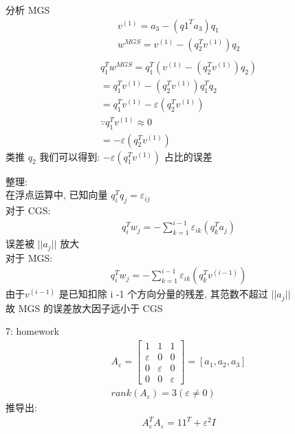 \documentclass[12pt]{article}
\begin{document}
\begin{flushleft}
    分析 MGS \\
    \begin{align}
        v^{(1)} =  a_{3} - (q1^{T}a_{3})q_{1}        \\
        w^{MGS} =  v^{(1)} - (q_{2}^{T}v^{(1)})q_{2} \\
    \end{align}
    \begin{align}
        q_{1}^{T}w^{MGS} = q_{1}^{T}(v^{(1)} -  (q_{2}^{T}v^{(1)})q_{2}) \\
        = q_{1}^{T}v^{(1)} -  (q_{2}^{T}v^{(1)})q_{1}^{T}q_{2}           \\
        = q_{1}^{T}v^{(1)}   -\varepsilon(q_{2}^{T}v^{(1)})              \\
        \because q_{1}^{T}v^{(1)}  \approx 0                             \\
        =  -\varepsilon(q_{2}^{T}v^{(1)})
    \end{align}
    类推 $q_{2}$ 我们可以得到: $-\varepsilon(q_{1}^{T}v^{(1)})$ 占比的误差

    整理: \\
    在浮点运算中, 已知向量 $q_{i}^{T}q_{j} = \varepsilon_{ij}$ \\
    对于 CGS: \\
    \begin{align}
        q_{i}^{T}w_{j} =  - \sum_{k = 1}^{i -1} \varepsilon_{ik}(q_{k}^{T}a_{j})
    \end{align}
    误差被 $||a_{j}||$ 放大 \\
    对于 MGS: \\
    \begin{align}
        q_{i}^{T}w_{j} =  - \sum_{k = 1}^{i -1} \varepsilon_{ik}(q_{k}^{T}v^{(i - 1)})
    \end{align}
    由于$v^{(i - 1)}$ 是已知扣除 i -1 个方向分量的残差, 其范数不超过 $||a_{j}||$ \\
    故 MGS 的误差放大因子远小于 CGS


    7: homework \\
    \begin{align}
        A_{\varepsilon} = \begin{bmatrix}
                              1           & 1           & 1           \\
                              \varepsilon & 0           & 0           \\
                              0           & \varepsilon & 0           \\
                              0           & 0           & \varepsilon
                          \end{bmatrix} = [a_{1}, a_{2}, a_{3}] \\
        rank(A_{\varepsilon}) = 3  (\varepsilon \neq 0)
    \end{align}
    推导出: \\
    \begin{align}
        A_{\varepsilon}^{T}A_{\varepsilon} = 11^{T} + \varepsilon^{2}I
    \end{align}


\end{flushleft}
\end{document}
